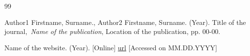 \begin{thebibliography}{99}

     Author1 Firstname, Surname., Author2 Firstname, Surname. (Year). Title of the journal,~\textit{Name of the publication}, Location of the publication, pp. 00{-}00.

     Name of the website. (Year). [Online] \url{url} [Accessed on MM.DD.YYYY]

\end{thebibliography}